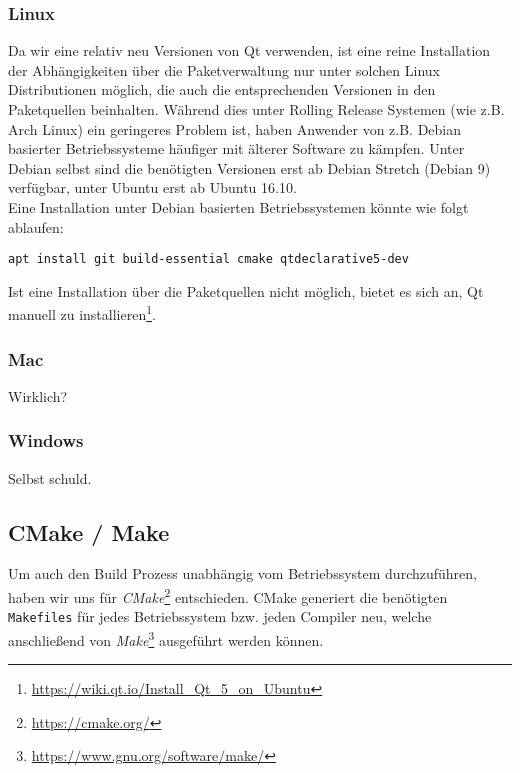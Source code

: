 \subsubsection{Linux}

Da wir eine relativ neu Versionen von Qt verwenden, ist eine reine Installation der
Abhängigkeiten über die Paketverwaltung nur unter solchen Linux Distributionen möglich,
die auch die entsprechenden Versionen in den Paketquellen beinhalten. Während dies unter
Rolling Release Systemen (wie z.B. Arch Linux) ein geringeres Problem ist, haben Anwender von
z.B. Debian basierter Betriebssysteme häufiger mit älterer Software zu kämpfen.
Unter Debian selbst sind die benötigten Versionen erst ab Debian Stretch (Debian 9)
verfügbar, unter Ubuntu erst ab Ubuntu 16.10. \\
Eine Installation unter Debian basierten Betriebssystemen könnte wie folgt ablaufen: \\

\begin{lstlisting}
apt install git build-essential cmake qtdeclarative5-dev
\end{lstlisting}

Ist eine Installation über die Paketquellen nicht möglich, bietet es sich an, Qt manuell
zu installieren\footnote{\url{https://wiki.qt.io/Install_Qt_5_on_Ubuntu}}.


\subsubsection{Mac}

Wirklich?

\subsubsection{Windows}

Selbst schuld.

\subsection{CMake / Make}

Um auch den Build Prozess unabhängig vom Betriebssystem durchzuführen, haben wir uns für
\textit{CMake}\footnote{\url{https://cmake.org/}} entschieden. CMake generiert die benötigten
\texttt{Makefiles} für jedes Betriebssystem bzw. jeden Compiler neu, welche anschließend
von \textit{Make}\footnote{\url{https://www.gnu.org/software/make/}} ausgeführt werden können.

